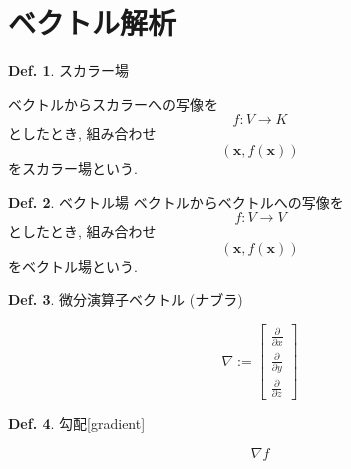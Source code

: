 \documentclass[a4paper,10pt,report]{amsart}
\theoremstyle{plain}
\theoremstyle{definition}
\newtheorem{defn}{Def.}[section]
\theoremstyle{remark}
\begin{document}
    \section{ベクトル解析}
    \begin{leftbar}
        \begin{defn}スカラー場\par
            ベクトルからスカラーへの写像を
            \begin{equation}
                f:V\to K
            \end{equation}
            としたとき, 組み合わせ
            \begin{equation}
                (\bm{x},f(\bm{x}))
            \end{equation}
            をスカラー場という.
        \end{defn}
    \end{leftbar}
    \begin{leftbar}
        \begin{defn}ベクトル場
            ベクトルからベクトルへの写像を
            \begin{equation}
                f:V\to V
            \end{equation}
            としたとき, 組み合わせ
            \begin{equation}
                (\bm{x},f(\bm{x}))
            \end{equation}
            をベクトル場という. 
        \end{defn}
    \end{leftbar}
    \begin{leftbar}
        \begin{defn}微分演算子ベクトル (ナブラ)\par
            \begin{equation}
                \nabla :=\begin{bmatrix}
                    \frac{\partial}{\partial x}\\
                    \frac{\partial}{\partial y}\\
                    \frac{\partial}{\partial z}
                \end{bmatrix}
            \end{equation}
        \end{defn}
    \end{leftbar}
    \begin{leftbar}
        \begin{defn}勾配[gradient]\par
            \begin{equation}
                \nabla f
            \end{equation}
        \end{defn}
    \end{leftbar}
\end{document}
